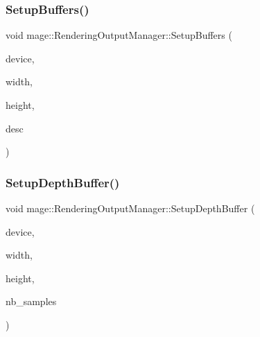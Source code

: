 \hypertarget{classmage_1_1_rendering_output_manager_afea7686ac1181f180c23fe65930a9eba}{}\label{classmage_1_1_rendering_output_manager_afea7686ac1181f180c23fe65930a9eba} 
\subsubsection{\texorpdfstring{Setup\+Buffers()}{SetupBuffers()}}
{\footnotesize\ttfamily void mage\+::\+Rendering\+Output\+Manager\+::\+Setup\+Buffers (\begin{DoxyParamCaption}\item[{I\+D3\+D11\+Device5 $\ast$}]{device,  }\item[{\hyperlink{namespacemage_a41c104c036fba3756a74e19f793eeaa1}{U32}}]{width,  }\item[{\hyperlink{namespacemage_a41c104c036fba3756a74e19f793eeaa1}{U32}}]{height,  }\item[{\hyperlink{namespacemage_a86cd40b8f2f42ca4d616cc6ec665a7f2}{A\+A\+Descriptor}}]{desc }\end{DoxyParamCaption})\hspace{0.3cm}{\ttfamily [private]}}

\hypertarget{classmage_1_1_rendering_output_manager_aa477546b3768a1a3679490d17d466e44}{}\label{classmage_1_1_rendering_output_manager_aa477546b3768a1a3679490d17d466e44} 
\subsubsection{\texorpdfstring{Setup\+Depth\+Buffer()}{SetupDepthBuffer()}}
{\footnotesize\ttfamily void mage\+::\+Rendering\+Output\+Manager\+::\+Setup\+Depth\+Buffer (\begin{DoxyParamCaption}\item[{I\+D3\+D11\+Device5 $\ast$}]{device,  }\item[{\hyperlink{namespacemage_a41c104c036fba3756a74e19f793eeaa1}{U32}}]{width,  }\item[{\hyperlink{namespacemage_a41c104c036fba3756a74e19f793eeaa1}{U32}}]{height,  }\item[{\hyperlink{namespacemage_a41c104c036fba3756a74e19f793eeaa1}{U32}}]{nb\+\_\+samples }\end{DoxyParamCaption})\hspace{0.3cm}{\ttfamily [private]}}




